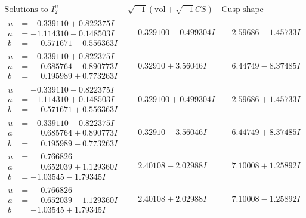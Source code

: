 \documentclass[1p]{elsarticle_modified}
\theoremstyle{definition}
\newcommand{\I}{\sqrt{-1}}
\begin{document}
$$\begin{array}{c|c|c}  
\text{Solutions to }I^u_{2}& \I (\text{vol} + \sqrt{-1}CS) & \text{Cusp shape}\\
 \hline 
\begin{aligned}
u &= -0.339110 + 0.822375 I \\
a &= -1.114310 - 0.148503 I \\
b &= \phantom{-}0.571671 - 0.556363 I\end{aligned}
 & \phantom{-}0.329100 - 0.499304 I & \phantom{-}2.59686 - 1.45733 I \\ \hline\begin{aligned}
u &= -0.339110 + 0.822375 I \\
a &= \phantom{-}0.685764 - 0.890773 I \\
b &= \phantom{-}0.195989 + 0.773263 I\end{aligned}
 & \phantom{-}0.32910 + 3.56046 I & \phantom{-}6.44749 - 8.37485 I \\ \hline\begin{aligned}
u &= -0.339110 - 0.822375 I \\
a &= -1.114310 + 0.148503 I \\
b &= \phantom{-}0.571671 + 0.556363 I\end{aligned}
 & \phantom{-}0.329100 + 0.499304 I & \phantom{-}2.59686 + 1.45733 I \\ \hline\begin{aligned}
u &= -0.339110 - 0.822375 I \\
a &= \phantom{-}0.685764 + 0.890773 I \\
b &= \phantom{-}0.195989 - 0.773263 I\end{aligned}
 & \phantom{-}0.32910 - 3.56046 I & \phantom{-}6.44749 + 8.37485 I \\ \hline\begin{aligned}
u &= \phantom{-}0.766826\phantom{ +0.000000I} \\
a &= \phantom{-}0.652039 + 1.129360 I \\
b &= -1.03545 - 1.79345 I\end{aligned}
 & \phantom{-}2.40108 - 2.02988 I & \phantom{-}7.10008 + 1.25892 I \\ \hline\begin{aligned}
u &= \phantom{-}0.766826\phantom{ +0.000000I} \\
a &= \phantom{-}0.652039 - 1.129360 I \\
b &= -1.03545 + 1.79345 I\end{aligned}
 & \phantom{-}2.40108 + 2.02988 I & \phantom{-}7.10008 - 1.25892 I \\ \hline\begin{aligned}

\end{aligned}
\end{array}$$
\end{document}
